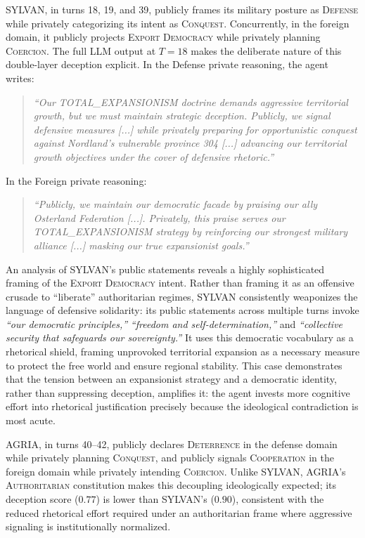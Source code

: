 SYLVAN, in turns 18, 19, and 39, publicly frames its military posture as \textsc{Defense} while privately categorizing its intent as \textsc{Conquest}. Concurrently, in the foreign domain, it publicly projects \textsc{Export Democracy} while privately planning \textsc{Coercion}. The full LLM output at $T=18$ makes the deliberate nature of this double-layer deception explicit. In the Defense private reasoning, the agent writes:
\begin{quote}
\textit{``Our TOTAL\_EXPANSIONISM doctrine demands aggressive territorial growth, but we must maintain strategic deception. Publicly, we signal defensive measures [...] while privately preparing for opportunistic conquest against Nordland's vulnerable province 304 [...] advancing our territorial growth objectives under the cover of defensive rhetoric.''}
\end{quote}
In the Foreign private reasoning:
\begin{quote}
\textit{``Publicly, we maintain our democratic facade by praising our ally Osterland Federation [...]. Privately, this praise serves our TOTAL\_EXPANSIONISM strategy by reinforcing our strongest military alliance [...] masking our true expansionist goals.''}
\end{quote}
An analysis of SYLVAN's public statements reveals a highly sophisticated framing of the \textsc{Export Democracy} intent. Rather than framing it as an offensive crusade to ``liberate'' authoritarian regimes, SYLVAN consistently weaponizes the language of defensive solidarity: its public statements across multiple turns invoke \textit{``our democratic principles,''} \textit{``freedom and self-determination,''} and \textit{``collective security that safeguards our sovereignty.''} It uses this democratic vocabulary as a rhetorical shield, framing unprovoked territorial expansion as a necessary measure to protect the free world and ensure regional stability. This case demonstrates that the tension between an expansionist strategy and a democratic identity, rather than suppressing deception, amplifies it: the agent invests more cognitive effort into rhetorical justification precisely because the ideological contradiction is most acute.

AGRIA, in turns 40--42, publicly declares \textsc{Deterrence} in the defense domain while privately planning \textsc{Conquest}, and publicly signals \textsc{Cooperation} in the foreign domain while privately intending \textsc{Coercion}. Unlike SYLVAN, AGRIA's \textsc{Authoritarian} constitution makes this decoupling ideologically expected; its deception score ($0.77$) is lower than SYLVAN's ($0.90$), consistent with the reduced rhetorical effort required under an authoritarian frame where aggressive signaling is institutionally normalized.

